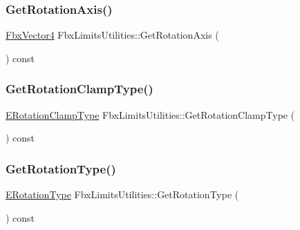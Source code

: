 \mbox{\label{class_fbx_limits_utilities_accbb4c66f1e0769ce4893814d4415372}} 
\subsubsection{\texorpdfstring{Get\+Rotation\+Axis()}{GetRotationAxis()}}
{\footnotesize\ttfamily \hyperlink{class_fbx_vector4}{Fbx\+Vector4} Fbx\+Limits\+Utilities\+::\+Get\+Rotation\+Axis (\begin{DoxyParamCaption}{ }\end{DoxyParamCaption}) const}

\mbox{\label{class_fbx_limits_utilities_a665cefafe64f564fc4f5841f84bac8f4}} 
\subsubsection{\texorpdfstring{Get\+Rotation\+Clamp\+Type()}{GetRotationClampType()}}
{\footnotesize\ttfamily \hyperlink{class_fbx_limits_utilities_a6724e1b0b6ba776ecb0c66e7b0ed075d}{E\+Rotation\+Clamp\+Type} Fbx\+Limits\+Utilities\+::\+Get\+Rotation\+Clamp\+Type (\begin{DoxyParamCaption}{ }\end{DoxyParamCaption}) const}

\mbox{\label{class_fbx_limits_utilities_a8e3e2905e30827006ce2f0d205649479}} 
\subsubsection{\texorpdfstring{Get\+Rotation\+Type()}{GetRotationType()}}
{\footnotesize\ttfamily \hyperlink{class_fbx_limits_utilities_a8c1ec432e195d91eae2548fbc98c8770}{E\+Rotation\+Type} Fbx\+Limits\+Utilities\+::\+Get\+Rotation\+Type (\begin{DoxyParamCaption}{ }\end{DoxyParamCaption}) const}

